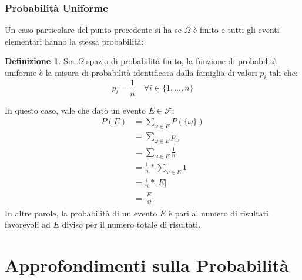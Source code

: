 \documentclass{article}
\theoremstyle{plain}
\theoremstyle{definition}
\newtheorem{definizione}{Definizione}[section]
\theoremstyle{remark}
\begin{document}
\subsubsection{Probabilità Uniforme} %
\label{subs:probabilità_uniforme}
Un caso particolare del punto precedente si ha se $\Omega$ è finito e tutti gli eventi elementari hanno la stessa probabilità:
\begin{definizione}
	Sia $\Omega$ spazio di probabilità finito, la funzione di probabilità uniforme è la misura di probabilità identificata dalla famiglia di valori $p_i$ tali che:
	\begin{equation*}
		p_i=\frac{1}{n}\quad\forall i\in\{1,...,n\}
	\end{equation*}
\end{definizione}
In questo caso, vale che dato un evento $E\in\mathcal{F}:$
\begin{align*}
	P(E)&=\sum_{\omega\in E} P(\{\omega\})\\
	&=\sum_{\omega\in E} p_\omega\\
	&=\sum_{\omega\in E} \frac{1}{n}\\
	&=\frac{1}{n}*\sum_{\omega\in E} 1\\
	&=\frac{1}{n}*\lvert E\rvert\\
	&=\frac{\lvert E\rvert}{\lvert\Omega\rvert}
\end{align*}
In altre parole, la probabilità di un evento $E$ è pari al numero di risultati favorevoli ad $E$ diviso per il numero totale di risultati.
\section{Approfondimenti sulla Probabilità} %
\label{sec:approfondimenti_sulla_probabilità}
\end{document}

